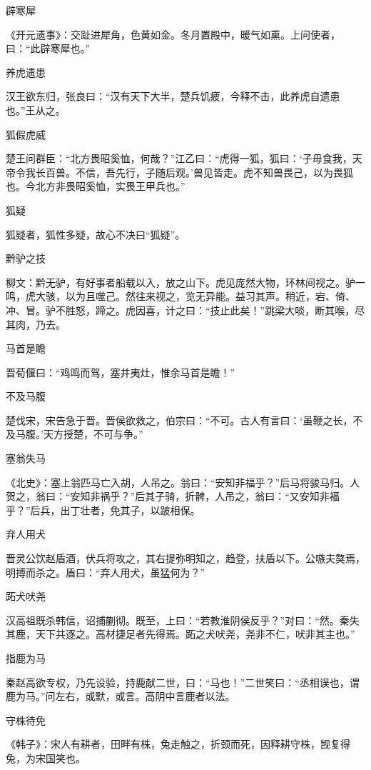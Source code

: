 \documentclass[a4paper,12pt,UTF8,twoside]{ctexbook}
\begin{document}
    辟寒犀
    
    《开元遗事》：交趾进犀角，色黄如金。冬月置殿中，暖气如熏。上问使者，曰：“此辟寒犀也。”
    
    养虎遗患
    
    汉王欲东归，张良曰：“汉有天下大半，楚兵饥疲，今释不击，此养虎自遗患也。”王从之。
    
    狐假虎威
    
    楚王问群臣：“北方畏昭奚恤，何哉？”江乙曰：“虎得一狐，狐曰：‘子毋食我，天帝令我长百兽。不信，吾先行，子随后观。’兽见皆走。虎不知兽畏己，以为畏狐也。今北方非畏昭奚恤，实畏王甲兵也。”
    
    狐疑
    
    狐疑者，狐性多疑，故心不决曰“狐疑”。
    
    黔驴之技
    
    柳文：黔无驴，有好事者船载以入，放之山下。虎见庞然大物，环林间视之。驴一鸣，虎大骇，以为且噬己。然往来视之，览无异能。益习其声。稍近，宕、倚、冲、冒。驴不胜怒，蹄之。虎因喜，计之曰：“技止此矣！”跳梁大啖，断其喉，尽其肉，乃去。
    
    马首是瞻
    
    晋荀偃曰：“鸡鸣而驾，塞井夷灶，惟余马首是瞻！”
    
    不及马腹
    
    楚伐宋，宋告急于晋。晋侯欲救之，伯宗曰：“不可。古人有言曰：‘虽鞭之长，不及马腹。’天方授楚，不可与争。”
    
    塞翁失马
    
    《北史》：塞上翁匹马亡入胡，人吊之。翁曰：“安知非福乎？”后马将骏马归。人贺之，翁曰：“安知非祸乎？”后其子骑，折髀，人吊之，翁曰：“又安知非福乎？”后兵，出丁壮者，免其子，以跛相保。
    
    弃人用犬
    
    晋灵公饮赵盾酒，伏兵将攻之，其右提弥明知之，趋登，扶盾以下。公嗾夫獒焉，明搏而杀之。盾曰：“弃人用犬，虽猛何为？”
    
    跖犬吠尧
    
    汉高祖既杀韩信，诏捕蒯彻。既至，上曰：“若教淮阴侯反乎？”对曰：“然。秦失其鹿，天下共逐之。高材捷足者先得焉。跖之犬吠尧，尧非不仁，吠非其主也。”
    
    指鹿为马
    
    秦赵高欲专权，乃先设验，持鹿献二世，曰：“马也！”二世笑曰：“丞相误也，谓鹿为马。”问左右，或默，或言。高阴中言鹿者以法。
    
    守株待免
    
    《韩子》：宋人有耕者，田畔有株，兔走触之，折颈而死，因释耕守株，觊复得兔，为宋国笑也。
    
\end{document}
